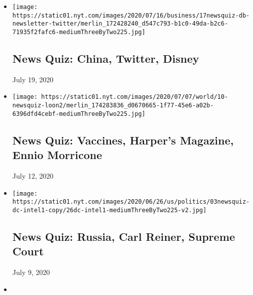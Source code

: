 \begin{itemize}
\item
  \href{https://www.nytimes.com/interactive/2020/07/17/briefing/china-twitter-disney-news-quiz.html}{}

  \texttt{[image: https://static01.nyt.com/images/2020/07/16/business/17newsquiz-db-newsletter-twitter/merlin\_172428240\_d547c793-b1c0-49da-b2c6-71935f2fafc6-mediumThreeByTwo225.jpg]}

  \hypertarget{news-quiz-china-twitter-disney}{%
  \subsection{News Quiz: China, Twitter,
  Disney}\label{news-quiz-china-twitter-disney}}

  July 19, 2020
\item
  \href{https://www.nytimes.com/interactive/2020/07/10/briefing/vaccines-harpers-magazine-ennio-morricone-news-quiz.html}{}

  \texttt{[image: https://static01.nyt.com/images/2020/07/07/world/10-newsquiz-loon2/merlin\_174283836\_d0670665-1f77-45e6-a02b-6396dfd4cebf-mediumThreeByTwo225.jpg]}

  \hypertarget{news-quiz-vaccines-harpers-magazine-ennio-morricone}{%
  \subsection{News Quiz: Vaccines, Harper's Magazine, Ennio
  Morricone}\label{news-quiz-vaccines-harpers-magazine-ennio-morricone}}

  July 12, 2020
\item
  \href{https://www.nytimes.com/interactive/2020/07/03/briefing/russia-carl-reiner-supreme-court-news-quiz.html}{}

  \texttt{[image: https://static01.nyt.com/images/2020/06/26/us/politics/03newsquiz-dc-intel1-copy/26dc-intel1-mediumThreeByTwo225-v2.jpg]}

  \hypertarget{news-quiz-russia-carl-reiner-supreme-court}{%
  \subsection{News Quiz: Russia, Carl Reiner, Supreme
  Court}\label{news-quiz-russia-carl-reiner-supreme-court}}

  July 9, 2020
\item
  \href{https://www.nytimes.com/interactive/2020/06/26/briefing/geoffrey-berman-coronavirus-statues-news-quiz.html}{}


\end{itemize}
